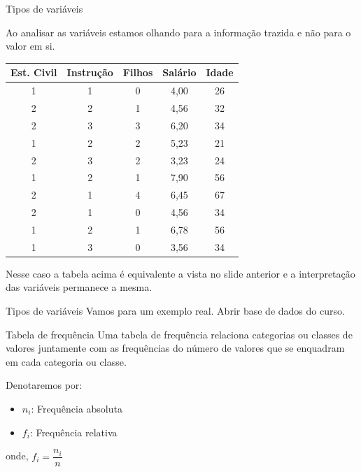 \begin{frame}{Tipos de variáveis}
    \begin{atencao}
    Ao analisar as variáveis estamos olhando para a informação trazida e não para o valor em si. 
    \end{atencao}
    
    \pause
\begin{table}[H]
\begin{tabular}{ccccc}
\hline
Est. Civil & Instrução & Filhos & Salário & Idade \\ \hline
1          & 1         & 0      & 4,00    & 26    \\
2          & 2         & 1      & 4,56    & 32    \\
2          & 3         & 3      & 6,20    & 34    \\
1          & 2         & 2      & 5,23    & 21    \\
2          & 3         & 2      & 3,23    & 24    \\
1          & 2         & 1      & 7,90    & 56    \\
2          & 1         & 4      & 6,45    & 67    \\
2          & 1         & 0      & 4,56    & 34    \\
1          & 2         & 1      & 6,78    & 56    \\
1          & 3         & 0      & 3,56    & 34    \\ \hline
\end{tabular}
\end{table}
\pause
Nesse caso a tabela acima é equivalente a vista no slide anterior e a interpretação das variáveis permanece a mesma.
\end{frame}

\begin{frame}{Tipos de variáveis}
    Vamos para um exemplo real. Abrir base de dados do curso. 
\end{frame}

\begin{frame}{Tabela de frequência}
    Uma tabela de frequência relaciona categorias ou classes de valores juntamente com as frequências do número de valores que se enquadram em cada categoria ou classe. 

    Denotaremos por:
    \begin{itemize}
    \item $n_i$: Frequência absoluta
    \item $f_i$: Frequência relativa
\end{itemize}

onde, $f_i = \dfrac{n_i}{n}$
\end{frame}


